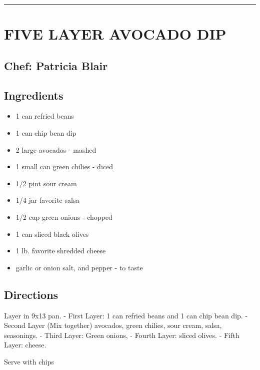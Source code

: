 \documentclass[
]{book}
\providecommand{\tightlist}{%
  \setlength{\itemsep}{0pt}\setlength{\parskip}{0pt}}
\begin{document}
\begin{center}\rule{0.5\linewidth}{0.5pt}\end{center}

\hypertarget{five-layer-avocado-dip}{%
\section*{FIVE LAYER AVOCADO DIP}\label{five-layer-avocado-dip}}


\hypertarget{chef-patricia-blair-2}{%
\subsection*{Chef: Patricia Blair}\label{chef-patricia-blair-2}}


\hypertarget{ingredients-5}{%
\subsection*{Ingredients}\label{ingredients-5}}


\begin{itemize}
\tightlist
\item
  1 can refried beans
\item
  1 can chip bean dip
\item
  2 large avocados - mashed
\item
  1 small can green chilies - diced
\item
  1/2 pint sour cream
\item
  1/4 jar favorite salsa
\item
  1/2 cup green onions - chopped
\item
  1 can sliced black olives
\item
  1 lb. favorite shredded cheese
\item
  garlic or onion salt, and pepper - to taste
\end{itemize}

\hypertarget{directions-5}{%
\subsection*{Directions}\label{directions-5}}


Layer in 9x13 pan.
- First Layer: 1 can refried beans and 1 can chip bean dip.
- Second Layer (Mix together) avocados, green chilies, sour cream, salsa, seasonings.
- Third Layer: Green onions,
- Fourth Layer: sliced olives.
- Fifth Layer: cheese.

Serve with chips
\end{document}
